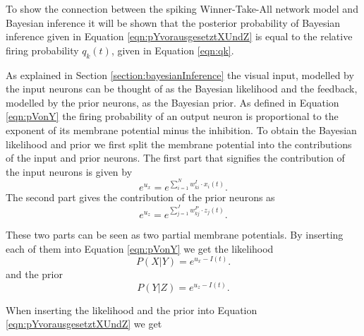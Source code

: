 To show the connection between the spiking Winner-Take-All network model and Bayesian inference it will be shown that the posterior probability of Bayesian inference given in Equation \ref{eqn:pYvorausgesetztXUndZ} is equal to the relative firing probability $q_k(t)$, given in Equation \ref{eqn:qk}.

As explained in Section \ref{section:bayesianInference} the visual input, modelled by the input neurons can be thought of as the Bayesian likelihood and the feedback, modelled by the prior neurons, as the Bayesian prior. As defined in Equation \ref{eqn:pVonY} the firing probability of an output neuron is proportional to the exponent of its membrane potential minus the inhibition. To obtain the Bayesian likelihood and prior we first split the membrane potential into the contributions of the input and prior neurons. The first part that signifies the contribution of the input neurons is given by
\begin{equation}
e^{u_x} = e^{\sum_{i=1}^N w^{I}_{ki} \cdot x_i(t)}.
\end{equation}
The second part gives the contribution of the prior neurons as
\begin{equation}
e^{u_z} = e^{\sum_{j=1}^J w^{P}_{kj} \cdot z_j(t)}.
\end{equation}

These two parts can be seen as two partial membrane potentials. By inserting each of them into Equation \ref{eqn:pVonY} we get the likelihood
\begin{equation}
P(X|Y) = e^{u_x - I(t)}.
\end{equation}
and the prior
\begin{equation}
P(Y|Z) = e^{u_z - I(t)}.
\end{equation}

When inserting the likelihood and the prior into Equation \ref{eqn:pYvorausgesetztXUndZ} we get

